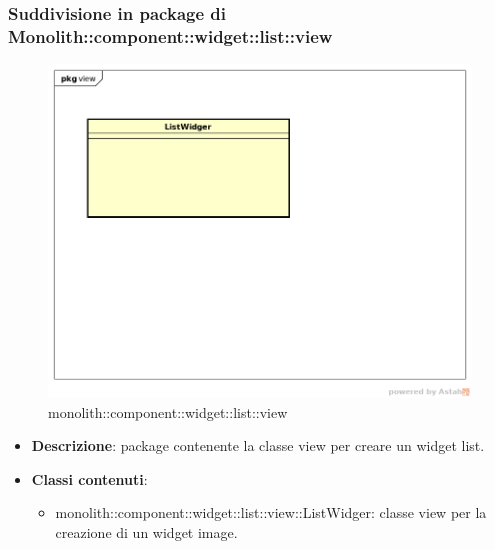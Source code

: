 \subsubsection{Suddivisione in package  di Monolith::component::widget::list::view}
\label{monolith::component::widget::list::view}
\begin{figure}[H]
	\centering
	\includegraphics[scale=0.5]{Sezioni/imgPackage/component_widget_list_view.png}
	\caption{monolith::component::widget::list::view}
\end{figure}
\begin{itemize}
	\item{\textbf{Descrizione}}: package contenente la classe view per creare un widget list.
	\item{\textbf{Classi contenuti}}:
	\begin{itemize}
	\item{monolith::component::widget::list::view::ListWidger}: classe view per la creazione di un widget image.
	\end{itemize}
\end{itemize}


